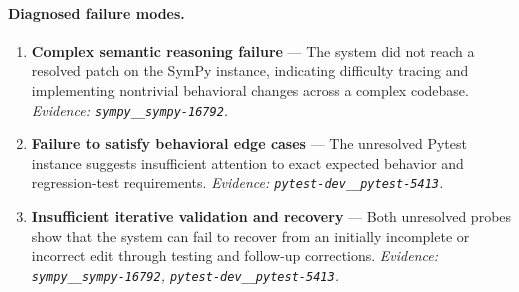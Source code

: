 \paragraph{Diagnosed failure modes.}\begin{enumerate}\itemsep1pt
\item \textbf{Complex semantic reasoning failure} --- The system did not reach a resolved patch on the SymPy instance, indicating difficulty tracing and implementing nontrivial behavioral changes across a complex codebase. \emph{Evidence: \texttt{sympy\_\_sympy-16792}.}
\item \textbf{Failure to satisfy behavioral edge cases} --- The unresolved Pytest instance suggests insufficient attention to exact expected behavior and regression-test requirements. \emph{Evidence: \texttt{pytest-dev\_\_pytest-5413}.}
\item \textbf{Insufficient iterative validation and recovery} --- Both unresolved probes show that the system can fail to recover from an initially incomplete or incorrect edit through testing and follow-up corrections. \emph{Evidence: \texttt{sympy\_\_sympy-16792}, \texttt{pytest-dev\_\_pytest-5413}.}
\end{enumerate}
